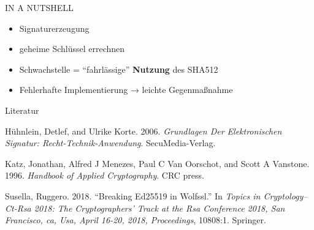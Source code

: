 \begin{frame}{IN A NUTSHELL}
\protect\hypertarget{in-a-nutshell}{}
\begin{itemize}
\tightlist
\item
  Signaturerzeugung
\end{itemize}

\pause

\begin{itemize}
\tightlist
\item
  geheime Schlüssel errechnen
\end{itemize}

\pause

\begin{itemize}
\tightlist
\item
  Schwachstelle = ``fahrlässige'' \textbf{Nutzung} des SHA512
\end{itemize}

\pause

\begin{itemize}
\tightlist
\item
  Fehlerhafte Implementierung → leichte Gegenmaßnahme
\end{itemize}
\end{frame}

\begin{frame}{Literatur}
\protect\hypertarget{literatur}{}
\hypertarget{refs}{}
\begin{cslreferences}
\leavevmode\hypertarget{ref-huhnlein2006grundlagen}{}%
Hühnlein, Detlef, and Ulrike Korte. 2006. \emph{Grundlagen Der
Elektronischen Signatur: Recht-Technik-Anwendung}. SecuMedia-Verlag.

\leavevmode\hypertarget{ref-katz1996handbook}{}%
Katz, Jonathan, Alfred J Menezes, Paul C Van Oorschot, and Scott A
Vanstone. 1996. \emph{Handbook of Applied Cryptography}. CRC press.

\leavevmode\hypertarget{ref-susella2018breaking}{}%
Susella, Ruggero. 2018. ``Breaking Ed25519 in Wolfssl.'' In \emph{Topics
in Cryptology--Ct-Rsa 2018: The Cryptographers' Track at the Rsa
Conference 2018, San Francisco, ca, Usa, April 16-20, 2018,
Proceedings}, 10808:1. Springer.
\end{cslreferences}
\end{frame}
